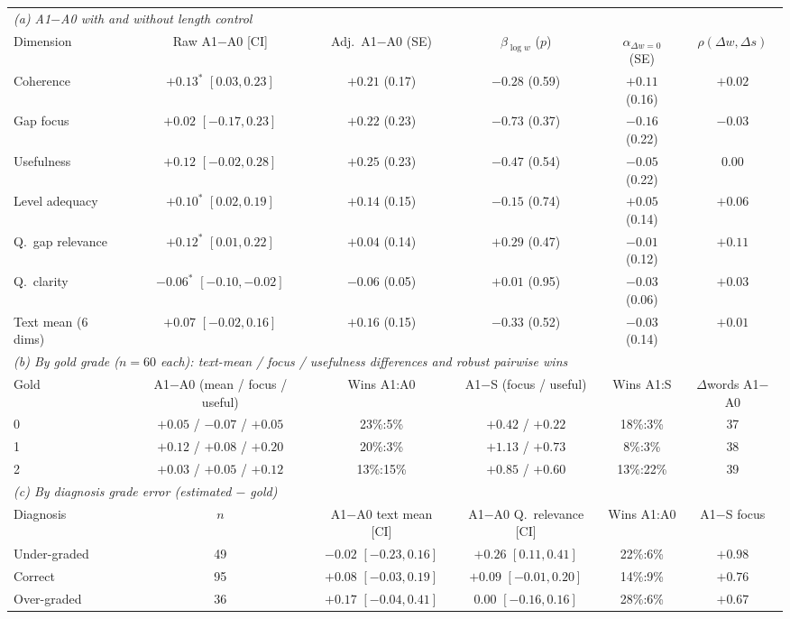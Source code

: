\begin{tabular}{lccccc}
\toprule
\multicolumn{6}{l}{\textit{(a) A1$-$A0 with and without length control}} \\
Dimension & Raw A1$-$A0 [CI] & Adj.\ A1$-$A0 (SE) & $\beta_{\log w}$ ($p$) & $\alpha_{\Delta w=0}$ (SE) & $\rho(\Delta w, \Delta s)$ \\
\midrule
Coherence & $+0.13^{*}$ $[0.03, 0.23]$ & $+0.21$ (0.17) & $-0.28$ (0.59) & $+0.11$ (0.16) & $+0.02$ \\
Gap focus & $+0.02$ $[-0.17, 0.23]$ & $+0.22$ (0.23) & $-0.73$ (0.37) & $-0.16$ (0.22) & $-0.03$ \\
Usefulness & $+0.12$ $[-0.02, 0.28]$ & $+0.25$ (0.23) & $-0.47$ (0.54) & $-0.05$ (0.22) & $0.00$ \\
Level adequacy & $+0.10^{*}$ $[0.02, 0.19]$ & $+0.14$ (0.15) & $-0.15$ (0.74) & $+0.05$ (0.14) & $+0.06$ \\
Q.\ gap relevance & $+0.12^{*}$ $[0.01, 0.22]$ & $+0.04$ (0.14) & $+0.29$ (0.47) & $-0.01$ (0.12) & $+0.11$ \\
Q.\ clarity & $-0.06^{*}$ $[-0.10, -0.02]$ & $-0.06$ (0.05) & $+0.01$ (0.95) & $-0.03$ (0.06) & $+0.03$ \\
Text mean (6 dims) & $+0.07$ $[-0.02, 0.16]$ & $+0.16$ (0.15) & $-0.33$ (0.52) & $-0.03$ (0.14) & $+0.01$ \\
\midrule
\multicolumn{6}{l}{\textit{(b) By gold grade ($n{=}60$ each): text-mean / focus / usefulness differences and robust pairwise wins}} \\
Gold & A1$-$A0 (mean / focus / useful) & Wins A1:A0 & A1$-$S (focus / useful) & Wins A1:S & $\Delta$words A1$-$A0 \\
\midrule
0 & $+0.05$ / $-0.07$ / $+0.05$ & 23\%:5\% & $+0.42$ / $+0.22$ & 18\%:3\% & 37 \\
1 & $+0.12$ / $+0.08$ / $+0.20$ & 20\%:3\% & $+1.13$ / $+0.73$ & 8\%:3\% & 38 \\
2 & $+0.03$ / $+0.05$ / $+0.12$ & 13\%:15\% & $+0.85$ / $+0.60$ & 13\%:22\% & 39 \\
\midrule
\multicolumn{6}{l}{\textit{(c) By diagnosis grade error (estimated $-$ gold)}} \\
Diagnosis & $n$ & A1$-$A0 text mean [CI] & A1$-$A0 Q.\ relevance [CI] & Wins A1:A0 & A1$-$S focus \\
\midrule
Under-graded & 49 & $-0.02$ $[-0.23, 0.16]$ & $+0.26$ $[0.11, 0.41]$ & 22\%:6\% & $+0.98$ \\
Correct & 95 & $+0.08$ $[-0.03, 0.19]$ & $+0.09$ $[-0.01, 0.20]$ & 14\%:9\% & $+0.76$ \\
Over-graded & 36 & $+0.17$ $[-0.04, 0.41]$ & $0.00$ $[-0.16, 0.16]$ & 28\%:6\% & $+0.67$ \\
\bottomrule
\end{tabular}
